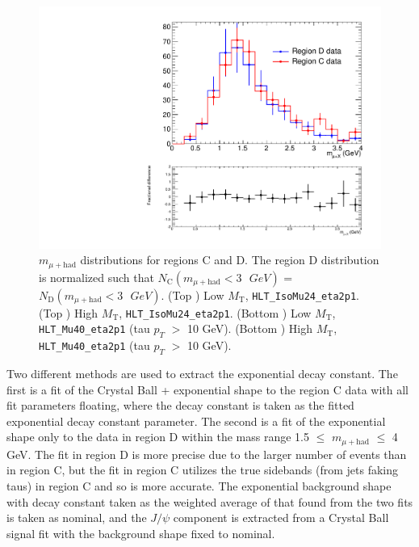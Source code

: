 \begin{figure}[hbtp]
\begin{center}
    \includegraphics[width=\cmsFigWidth]{figures/muHadMassCanvas_regCDataVsRegDData_Mu40_eta2p1_highMT}
    \caption{$m_{\mu+\text{had}}$ distributions for regions C and D.  The region D distribution is normalized such that $N_{\text{C}}(m_{\mu+\text{had}} < 3\text{ }GeV)$ = $N_{\text{D}}(m_{\mu+\text{had}} < 3\text{ }GeV)$.  (Top \cmsLeft) Low $M_{\text{T}}$, \texttt{HLT\_IsoMu24\_eta2p1}.  (Top \cmsRight) High $M_{\text{T}}$, \texttt{HLT\_IsoMu24\_eta2p1}.  (Bottom \cmsLeft) Low $M_{\text{T}}$, \texttt{HLT\_Mu40\_eta2p1} (tau $p_T$ $>$ 10 GeV).  (Bottom \cmsRight) High $M_{\text{T}}$, \texttt{HLT\_Mu40\_eta2p1} (tau $p_T$ $>$ 10 GeV).}
    \label{fig:regC-vs-regD}
  \end{center}
\end{figure}

Two different methods are used to extract the exponential decay constant.  The first is a fit of the Crystal Ball + exponential shape to the region C data with all fit parameters floating, where the decay constant is taken as the fitted exponential decay constant parameter.  The second is a fit of the exponential shape only to the data in region D within the mass range 1.5 $\leq$ $m_{\mu+\text{had}}$ $\leq$ 4 GeV.  The fit in region D is more precise due to the larger number of events than in region C, but the fit in region C utilizes the true sidebands (from jets faking taus) in region C and so is more accurate.  The exponential background shape with decay constant taken as the weighted average of that found from the two fits is taken as nominal, and the $J\slash\psi$ component is extracted from a Crystal Ball signal fit with the background shape fixed to nominal.

